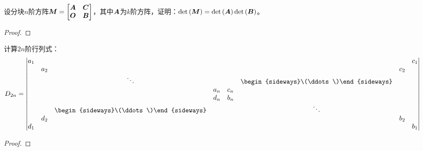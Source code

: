 \begin{problem}
设分块\(n\)阶方阵\(\boldsymbol{M}=\begin{bmatrix}\boldsymbol{A}&\boldsymbol{C}\\\boldsymbol{O}&\boldsymbol{B}\end{bmatrix}\)，其中\(\boldsymbol{A}\)为\(k\)阶方阵，证明：\(\mathrm{det}\left( \boldsymbol{M} \right)=\mathrm{det}\left( \boldsymbol{A} \right)\mathrm{det}\left( \boldsymbol{B} \right)\)。
\end{problem}
\begin{proof}

\end{proof}

\begin{problem}
计算\(2n\)阶行列式：
\begin{equation*}
    D_{2n}=
    \begin{vmatrix}
        a_1 &     &                                          &     &     &                                          &     & c_1 \\
            & a_2 &                                          &     &     &                                          & c_2 &     \\
            &     & \ddots                                   &     &     & \begin{sideways}\(\ddots\)\end{sideways} &     &     \\
            &     &                                          & a_n & c_n &                                          &     &     \\
            &     &                                          & d_n & b_n &                                          &     &     \\
            &     & \begin{sideways}\(\ddots\)\end{sideways} &     &     & \ddots                                   &     &     \\
            & d_2 &                                          &     &     &                                          & b_2 &     \\
        d_1 &     &                                          &     &     &                                          &     & b_1
    \end{vmatrix}
\end{equation*}
\end{problem}
\begin{proof}
\end{proof}

